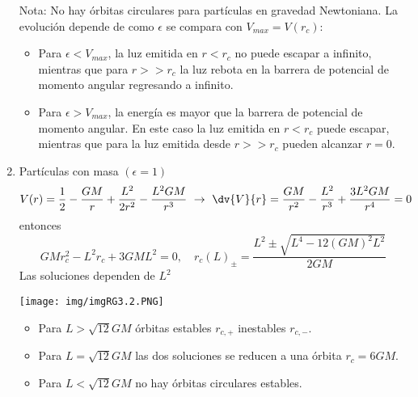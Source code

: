 \documentclass[../main]{subfiles}
\begin{document}
\begin{adjustwidth}{0pt}{-100pt}
\begin{enumerate}
    Nota: No hay órbitas circulares para partículas en gravedad Newtoniana. La evolución depende de como $\epsilon$ se compara con $V_{max}=V(r_c)$:
    \begin{itemize}
        \item Para $\epsilon<V_{max}$, la luz emitida en $r<r_c$ no puede escapar a infinito, mientras que para $r>>r_c$ la luz rebota en la barrera de potencial de momento angular regresando a infinito.
        \item Para $\epsilon>V_{max}$, la energía es mayor que la barrera de potencial de momento angular. En este caso la luz emitida en $r<r_c$ puede escapar, mientras que para la luz emitida desde $r>>r_c$ pueden alcanzar $r=0$.
    \end{itemize}
    \item Partículas con masa $(\epsilon=1)$
    \begin{equation}
        V(r)=\dfrac{1}{2}-\dfrac{GM}{r}+\dfrac{L^2}{2r^2}-\dfrac{L^2 GM}{r^3} \ \rightarrow \ \dv{V}{r}=\dfrac{GM}{r^2}-\dfrac{L^2}{r^3}+\dfrac{3L^2 GM}{r^4}=0
    \end{equation}
    entonces 
    \begin{equation}
        GMr^2_c-L^2 r_c+3GML^2=0,\quad r_c(L)_{\pm}=\dfrac{L^2 \pm \sqrt{L^4-12(GM)^2L^2}}{2GM}
    \end{equation}
    Las soluciones dependen de $L^2$

    \begin{minipage}{0.5\textwidth}
        \begin{center}
            \texttt{[image: img/imgRG3.2.PNG]}
        \end{center}
    \end{minipage}
    \begin{minipage}{0.4\textwidth}
    \begin{adjustwidth}{40pt}{-100pt}
        \begin{itemize}
            \item Para $L>\sqrt{12}GM$ órbitas estables $r_{c,+}$ inestables $r_{c,-}$.
            \item Para $L=\sqrt{12}GM$ las dos soluciones se reducen a una órbita $r_c=6GM$.
            \item Para $L<\sqrt{12}GM$ no hay órbitas circulares estables.
        \end{itemize}
    \end{adjustwidth}
    \end{minipage}
\end{enumerate}

\end{adjustwidth}
\end{document}
